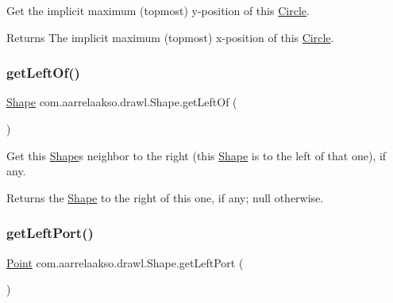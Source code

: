 Get the implicit maximum (topmost) y-\/position of this \hyperlink{classcom_1_1aarrelaakso_1_1drawl_1_1_circle}{Circle}. 

\begin{DoxyReturn}{Returns}
The implicit maximum (topmost) x-\/position of this \hyperlink{classcom_1_1aarrelaakso_1_1drawl_1_1_circle}{Circle}. 
\end{DoxyReturn}
\mbox{\label{classcom_1_1aarrelaakso_1_1drawl_1_1_shape_a2b19d5964ac46d545a7bae3133df6532}} 
\subsubsection{\texorpdfstring{get\+Left\+Of()}{getLeftOf()}}
{\footnotesize\ttfamily \hyperlink{classcom_1_1aarrelaakso_1_1drawl_1_1_shape}{Shape} com.\+aarrelaakso.\+drawl.\+Shape.\+get\+Left\+Of (\begin{DoxyParamCaption}{ }\end{DoxyParamCaption})\hspace{0.3cm}{\ttfamily [inherited]}}



Get this \hyperlink{classcom_1_1aarrelaakso_1_1drawl_1_1_shape}{Shape}\textquotesingle{}s neighbor to the right (this \hyperlink{classcom_1_1aarrelaakso_1_1drawl_1_1_shape}{Shape} is to the left of that one), if any. 

\begin{DoxyReturn}{Returns}
the \hyperlink{classcom_1_1aarrelaakso_1_1drawl_1_1_shape}{Shape} to the right of this one, if any; {\ttfamily null} otherwise. 
\end{DoxyReturn}
\mbox{\label{classcom_1_1aarrelaakso_1_1drawl_1_1_shape_aeffa96786ca552adf46924ec77da9555}} 
\subsubsection{\texorpdfstring{get\+Left\+Port()}{getLeftPort()}}
{\footnotesize\ttfamily \hyperlink{classcom_1_1aarrelaakso_1_1drawl_1_1_point}{Point} com.\+aarrelaakso.\+drawl.\+Shape.\+get\+Left\+Port (\begin{DoxyParamCaption}{ }\end{DoxyParamCaption})\hspace{0.3cm}{\ttfamily [inherited]}}



